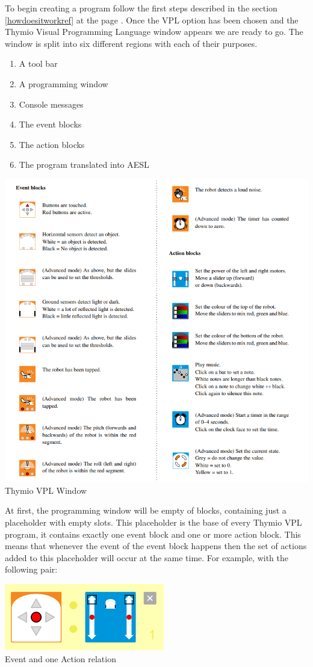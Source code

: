\documentclass{scrbook}
\begin{document}
To begin creating a program follow the first steps described in the section \ref{howdoesitworkref} at the page \pageref{howdoesitworkref}. 
Once the VPL option has been chosen and the Thymio Visual Programming Language window appears we are ready to go. 
The window is split into six different regions with each of their purposes.
\begin{enumerate}
  \item A tool bar
  \item A programming window
  \item Console messages
  \item The event blocks
  \item The action blocks
  \item The program translated into AESL
\end{enumerate}

\begin{center}
  \includegraphics[width=\textwidth]{./VPL/Thymio_blocks}
  Thymio VPL Window
\end{center}

At first, the programming window will be empty of blocks, containing just a placeholder with empty slots. 
This placeholder is the base of every Thymio VPL program, it contains exactly one event block and one or more action block. 
This means that whenever the event of the event block happens then the set of actions added to this placeholder will occur at the same time. 
For example, with the following pair: \\
\begin{center}
  \includegraphics[scale=0.5]{./VPL/middlebtn_forward}\\
  Event and one Action relation
\end{center}
\end{document}
